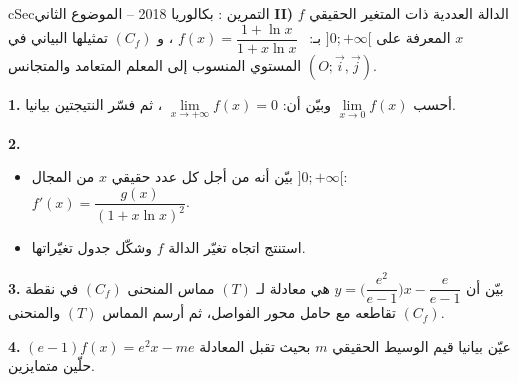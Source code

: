 \documentclass[12pt,a4paper]{article}
\newenvironment{BOX}[2]{\begin{otherlanguage}{english}\begin{arbox}{#1}{#2}}{\end{arbox}\end{otherlanguage}}
\newcounter{exo}
\newenvironment{tamrin}[1]{\stepcounter{exo}\begin{BOX}{cSec}{التمرين \theexo: #1}}{\end{BOX}}
\newenvironment{sq}{\begin{itemize}[leftmargin=2.4em,itemsep=3pt]}{\end{itemize}}
\newcommand{\qa}{\item[(أ)]}\newcommand{\qb}{\item[(ب)]}\newcommand{\qc}{\item[(جـ)]}\newcommand{\qd}{\item[(د)]}\newcommand{\qe}{\item[(هـ)]}
\newcommand{\QQ}[1]{\par\smallskip\textbf{#1.} }
\begin{document}
\begin{tamrin}{بكالوريا 2018 -- الموضوع الثاني}
\textbf{II)} $f$ الدالة العددية ذات المتغير الحقيقي $x$ المعرفة على $]0;+\infty[$ بـ: \ $f(x)=\dfrac{1+\ln x}{1+x\ln x}$ ،
و $(C_f)$ تمثيلها البياني في المستوي المنسوب إلى المعلم المتعامد والمتجانس $(O;\vec i,\vec j)$.
\QQ{1} أحسب $\lim\limits_{x\to0}f(x)$ وبيّن أن: $\lim\limits_{x\to+\infty}f(x)=0$ ، ثم فسّر النتيجتين بيانيا.
\QQ{2}
\begin{sq}
\qa بيّن أنه من أجل كل عدد حقيقي $x$ من المجال $]0;+\infty[$: \ $f'(x)=\dfrac{g(x)}{(1+x\ln x)^2}$.
\qb استنتج اتجاه تغيّر الدالة $f$ وشكّل جدول تغيّراتها.
\end{sq}
\QQ{3} بيّن أن $y=\Big(\dfrac{e^2}{e-1}\Big)x-\dfrac{e}{e-1}$ هي معادلة لـ $(T)$ مماس المنحنى $(C_f)$ في نقطة تقاطعه مع حامل محور الفواصل، ثم أرسم المماس $(T)$ والمنحنى $(C_f)$.
\QQ{4} عيّن بيانيا قيم الوسيط الحقيقي $m$ بحيث تقبل المعادلة $(e-1)f(x)=e^2x-me$ حلّين متمايزين.
\end{tamrin}
\end{document}
